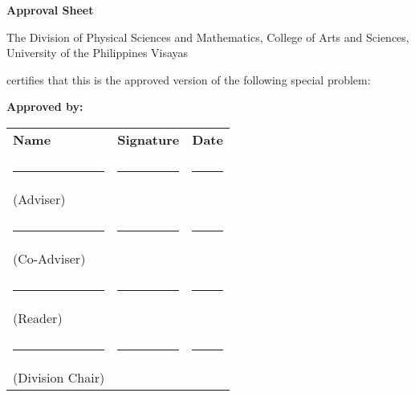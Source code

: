 \begin{center}
\textbf{Approval Sheet}
	
The Division of Physical Sciences and Mathematics, College of Arts and Sciences, University of the Philippines Visayas 

certifies that this is the approved version of the following special problem:

\end{center}

{\small\textbf{Approved by:}}

\newcommand{\signaturerule}{\rule{10em}{.4pt}}
	\begin{tabular}{lll}
		\bfseries Name  & \bfseries Signature & \bfseries Date\\ \\
		\signaturerule &\signaturerule  & \signaturerule\\ 
		(Adviser)\\ \\
		\signaturerule &\signaturerule &\signaturerule\\
		(Co-Adviser)\\ \\
		\signaturerule &\signaturerule &\signaturerule\\
		(Reader)\\ \\
		\signaturerule &\signaturerule &\signaturerule\\
		(Division Chair)

	\end{tabular}
